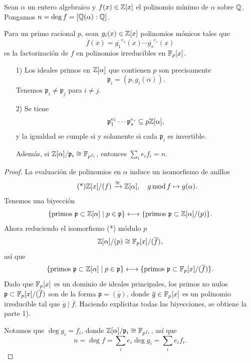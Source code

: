 \begin{teorema}
  Sean $\alpha$ un entero algebraico y $f (x) \in \mathbb{Z} [x]$ el polinomio mínimo
  de $\alpha$ sobre $\mathbb{Q}$. Pongamos $n = \deg f = [\mathbb{Q} (\alpha) : \mathbb{Q}]$.

  Para un primo racional $p$, sean $g_i (x) \in \mathbb{Z} [x]$ polinomios mónicos
  tales que
  $$\overline{f} (x) = \overline{g_1}^{e_1} (x) \cdots \overline{g_s}^{e_s} (x)$$
  es la factorización de $f$ en polinomios irreducibles en $\mathbb{F}_p [x]$.

  \begin{enumerate}
  \item[1)] Los ideales primos en $\mathbb{Z} [\alpha]$ que contienen $p$ son precisamente
    $$\mathfrak{p}_i = (p, g_i (\alpha)).$$
    Tenemos $\mathfrak{p}_i \ne \mathfrak{p}_j$ para $i\ne j$.

  \item[2)] Se tiene
    $$\mathfrak{p}_1^{e_1} \cdots \mathfrak{p}_s^{e_s} \subseteq p \mathbb{Z} [\alpha],$$
    y la igualdad se cumple si y solamente si cada $\mathfrak{p}_i$ es invertible.

    Además, si $\mathbb{Z} [\alpha]/\mathfrak{p}_i \cong \mathbb{F}_{p^{f_i}}$,
    entonces $\sum_i e_i f_i = n$.
  \end{enumerate}

  \begin{proof}
    La evaluación de polinomios en $\alpha$ induce un isomorfismo de anillos
    \[ \tag{*} \mathbb{Z} [x] / (f) \xrightarrow{\cong} \mathbb{Z} [\alpha], \quad
       g \operatorname{mod} f \mapsto g (\alpha). \]
    Tenemos una biyección
    \[ \{ \text{primos }\mathfrak{p}\subset\mathbb{Z}[\alpha] \mid p\in\mathfrak{p} \}
       \longleftrightarrow
       \{ \text{primos }\mathfrak{p} \subset \mathbb{Z}[\alpha]/(p) \}. \]
    Ahora reduciendo el isomorfismo (*) módulo $p$
    $$\mathbb{Z}[\alpha]/(p) \cong \mathbb{F}_p [x]/(\overline{f}),$$
    así que
    \[ \{ \text{primos }\mathfrak{p}\subset\mathbb{Z}[\alpha] \mid p \in \mathfrak{p} \}
       \longleftrightarrow
       \{ \text{primos }\mathfrak{p}\subset\mathbb{F}_p [x]/(\overline{f}) \}. \]
    Dado que $\mathbb{F}_p [x]$ es un dominio de ideales principales, los primos no
    nulos $\mathfrak{p} \subset \mathbb{F}_p [x]/(\overline{f})$ son de la forma
    $\mathfrak{p} = (\overline{g})$, donde $\overline{g} \in \mathbb{F}_p [x]$
    es un polinomio irreducible tal que $\overline{g} \mid \overline{f}$.
    Haciendo explícitas todas las biyecciones, se obtiene la parte 1).

    Notamos que $\deg g_i = f_i$, donde
    $\mathbb{Z}[\alpha]/\mathfrak{p}_i \cong \mathbb{F}_{p^{f_i}}$, así que
    $$n = \deg f = \sum_i e_i \deg g_i = \sum_i e_i f_i.$$


\end{proof}
\end{teorema}
